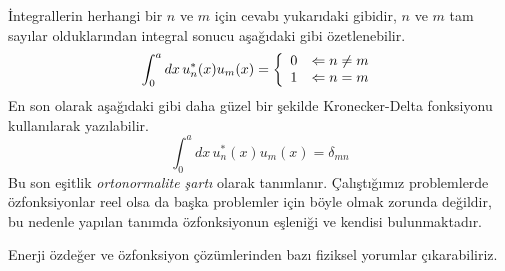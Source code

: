 \documentclass[a4paper,12pt, twoside]{article}
\begin{document}
İntegrallerin herhangi bir $n$ ve $m$ için cevabı yukarıdaki gibidir, $n$ ve $m$ tam sayılar olduklarından integral sonucu aşağıdaki gibi özetlenebilir.
\begin{equation}
\int _ { 0 } ^ { a } d x \, u _ { n } ^ { * } ( x ) u _ { m } ( x )  = \left\{
\begin{array} { c l } 
{ 0 } & { \Leftarrow n \neq m } \\ 
{ 1 } & { \Leftarrow n = m} 
\end{array} 
\right.
\label{eq:orthonormality}
\end{equation}
En son olarak aşağıdaki gibi daha güzel bir şekilde Kronecker-Delta fonksiyonu kullanılarak yazılabilir.
\begin{equation}
\int _ { 0 } ^ { a }  d x \, u _ { n } ^ { * } ( x ) u _ { m } ( x ) = \delta _ { m n }
\end{equation}
Bu son eşitlik \emph{ortonormalite şartı} olarak tanımlanır. Çalıştığımız problemlerde özfonksiyonlar reel olsa da başka problemler için böyle olmak zorunda değildir, bu nedenle yapılan tanımda özfonksiyonun eşleniği ve kendisi bulunmaktadır.

Enerji özdeğer ve özfonksiyon çözümlerinden bazı fiziksel yorumlar çıkarabiliriz.
\end{document}
